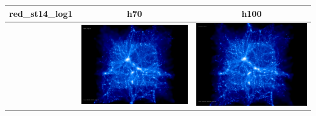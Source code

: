 \documentclass[a4paper,11pt,fleqn,oneside]{book}
\begin{document}
\begin{itemize}
\begin{table}[p]
\begin{tabular}{l|c|c}
\end{tabular}
\end{table}
\begin{table}[p]
\centering
\begin{tabular}{l|c|c}
red\_st14\_log1 & h70 & h100 \\
\hline 
 & \includegraphics[scale=0.075]{r256/h70/red_st14_log1/197.jpg} & \includegraphics[scale=0.075]{r256/h100/red_st14_log1/197.jpg} \\

\end{tabular}
\end{table}
\end{itemize}
\end{document}
